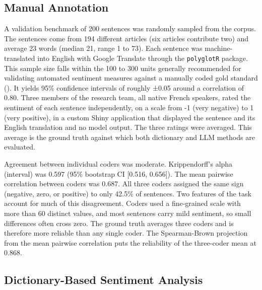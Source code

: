 \documentclass[
  man,
  floatsintext,
  longtable,
  nolmodern,
  notxfonts,
  notimes,
  colorlinks=true,linkcolor=blue,citecolor=blue,urlcolor=blue]{apa7}
\begin{document}
\subsection{Manual Annotation}\label{manual-annotation}

A validation benchmark of 200 sentences was randomly sampled from the
corpus. The sentences come from 194 different articles (six articles
contribute two) and average 23 words (median 21, range 1 to 73). Each
sentence was machine-translated into English with Google Translate
through the \texttt{polyglotR} package. This sample size falls within
the 100 to 300 units generally recommended for validating automated
sentiment measures against a manually coded gold standard
(). It yields 95\% confidence intervals of roughly ±0.05 around a
correlation of 0.80. Three members of the research team, all native
French speakers, rated the sentiment of each sentence independently, on
a scale from -1 (very negative) to 1 (very positive), in a custom Shiny
application that displayed the sentence and its English translation and
no model output. The three ratings were averaged. This average is the
ground truth against which both dictionary and LLM methods are
evaluated.

Agreement between individual coders was moderate. Krippendorff's alpha
(interval) was 0.597 (95\% bootstrap CI {[}0.516, 0.656{]}). The mean
pairwise correlation between coders was 0.687. All three coders assigned
the same sign (negative, zero, or positive) to only 42.5\% of sentences.
Two features of the task account for much of this disagreement. Coders
used a fine-grained scale with more than 60 distinct values, and most
sentences carry mild sentiment, so small differences often cross zero.
The ground truth averages three coders and is therefore more reliable
than any single coder. The Spearman-Brown projection from the mean
pairwise correlation puts the reliability of the three-coder mean at
0.868.

\subsection{Dictionary-Based Sentiment
Analysis}\label{dictionary-based-sentiment-analysis}
\end{document}
